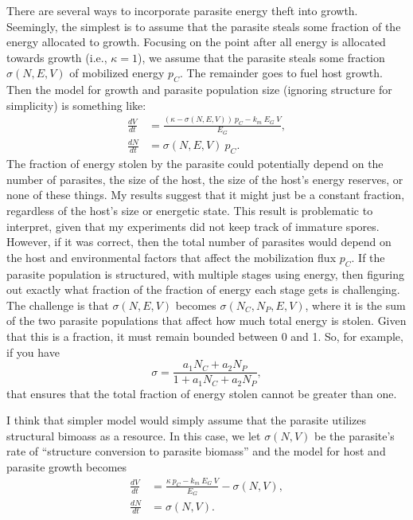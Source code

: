 \documentclass[12pt,reqno,final,pdftex]{amsart}\usepackage[]{graphicx}\usepackage[]{color}
\theoremstyle{plain}
\numberwithin{equation}{part}
\begin{document}
There are several ways to incorporate parasite energy theft into growth.
Seemingly, the simplest is to assume that the parasite steals some fraction of the energy allocated to growth.
Focusing on the point after all energy is allocated towards growth (i.e., $\kappa=1$), we assume that the parasite steals some fraction $\sigma(N,E,V)$ of mobilized energy $p_C$. The remainder goes to fuel host growth. Then the model for growth and parasite population size (ignoring structure for simplicity) is something like:
\begin{align}
\frac{dV}{dt} &= \frac{(\kappa-\sigma(N,E,V))~p_C - k_m~E_G~V}{E_G}, \\
\frac{dN}{dt} &= \sigma(N,E,V)~p_C.
\end{align}
The fraction of energy stolen by the parasite could potentially depend on the number of parasites, the size of the host, the size of the host's energy reserves, or none of these things.
My results suggest that it might just be a constant fraction, regardless of the host's size or energetic state.
This result is problematic to interpret, given that my experiments did not keep track of immature spores.
However, if it was correct, then the total number of parasites would depend on the host and environmental factors that affect the mobilization flux $p_C$.
If the parasite population is structured, with multiple stages using energy, then figuring out exactly what fraction of the fraction of energy each stage gets is challenging.
The challenge is that $\sigma(N,E,V)$ becomes $\sigma(N_C, N_P, E, V)$, where it is the sum of the two parasite populations that affect how much total energy is stolen.
Given that this is a fraction, it must remain bounded between 0 and 1.
So, for example, if you have
\begin{equation}
\sigma = \frac{a_1 N_C + a_2 N_P}{1 + a_1 N_C + a_2 N_P},
\end{equation}
that ensures that the total fraction of energy stolen cannot be greater than one.

I think that simpler model would simply assume that the parasite utilizes structural bimoass as a resource.
In this case, we let $\sigma(N,V)$ be the parasite's rate of ``structure conversion to parasite biomass'' and the model for host and parasite growth becomes
\begin{align}
\frac{dV}{dt} &= \frac{\kappa~p_C - k_m~E_G~V }{E_G} - \sigma(N,V), \\
\frac{dN}{dt} &= \sigma(N,V).
\end{align}
\end{document}
